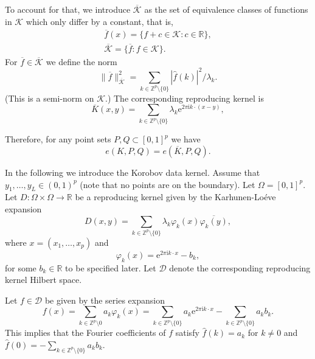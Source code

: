 \documentclass[12pt]{article}
\begin{document}
To account for that, we introduce $\overline{\mathcal{K}}$ as the set of equivalence classes of functions in $\mathcal{K}$ which only differ by a constant, that is,
\begin{align*}
\overline{f}(x) = \{f + c \in \mathcal{K}: c \in \mathbb{R}\}, \\
\overline{\mathcal{K}} = \{ \overline{f}: f \in \mathcal{K}\}.
\end{align*}
For $\overline{f} \in \overline{\mathcal{K}}$ we define the norm
\begin{equation*}
\|\overline{f} \|_{\overline{ \mathcal{K} }}^2 = \sum_{k \in \mathbb{Z}^p \setminus \{0\} } |\widehat{f}(k)|^2/\lambda_k.
\end{equation*}
(This is a semi-norm on $\mathcal{K}$.) The corresponding reproducing kernel is
\begin{equation*}
\overline{K}(x,y) = \sum_{k \in \mathbb{Z}^p \setminus \{0\} } \lambda_k \mathrm{e}^{2\pi \mathrm{i} k \cdot (x-y)},
\end{equation*}

Therefore, for any point sets $P, Q \subset [0,1]^p$ we have
\begin{equation*}
 e(K, P, Q) = e(\overline{K}, P, Q).
\end{equation*}




In the following we introduce the Korobov data kernel.
Assume that $y_1, \ldots, y_L \in (0,1)^p$ (note that no points are on the boundary). Let $\Omega = [0,1]^p$.
Let $D: \Omega \times \Omega \to \mathbb{R}$ be a reproducing kernel given by the Karhunen-Lo\'eve expansion
\begin{equation*}
D(x,y) = \sum_{k \in \mathbb{Z}^p \setminus \{0\} } \lambda_k \varphi_k(x) \overline{\varphi_k(y)},
\end{equation*}
where $x = (x_1, \ldots, x_p)$ and
\begin{equation*}
\varphi_k(x) =  \mathrm{e}^{2 \pi \mathrm{i} k \cdot x} - b_k,
\end{equation*}
for some $b_k \in \mathbb{R}$ to be specified later. Let $\mathcal{D}$ denote the corresponding reproducing kernel Hilbert space.

Let $f \in \mathcal{D}$ be given by the series expansion
\begin{equation*}
f(x) = \sum_{k \in \mathbb{Z}^p \setminus 0} a_k \varphi_k(x) =  \sum_{k \in \mathbb{Z}^p \setminus \{0\}} a_k \mathrm{e}^{2\pi \mathrm{i} k \cdot x} - \sum_{k \in \mathbb{Z}^p \setminus \{0\}} a_k b_k.
\end{equation*}
This implies that the Fourier coefficients of $f$ satisfy $\widehat{f}(k) = a_k$ for $k \neq 0$ and $\widehat{f}(0) = -  \sum_{k \in \mathbb{Z}^p \setminus \{0\}} a_k b_k$.
\end{document}
